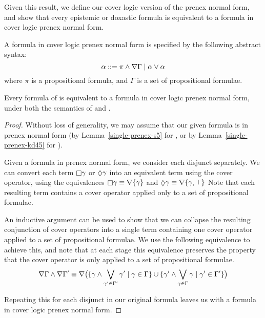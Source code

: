 Given this result, we define our cover logic version of the prenex normal form,
and show that every epistemic or doxastic formula is equivalent to a formula in
cover logic prenex normal form.

\begin{definition}
A formula in cover logic prenex normal form is specified by the following
abstract syntax: 
$$\alpha ::= \pi \land \nabla \Gamma \mid \alpha \lor \alpha$$
where $\pi$ is a propositional formula, and $\Gamma$ is a set of propositional
formulae.
\end{definition}

\begin{lemma}\label{single-cover-prenex}
Every formula of \langi{} is equivalent to a formula in cover logic prenex normal
form, under both the semantics of \logicSi{} and \logicKDi{}.
\end{lemma}

\begin{proof}
Without loss of generality, we may assume that our given formula is in prenex
normal form (by Lemma~\ref{single-prenex-s5} for \logicSi{}, or by
Lemma~\ref{single-prenex-kd45} for \logicKDi{}).

Given a formula in prenex normal form, we consider each disjunct separately. We
can convert each term $\knows \gamma$ or $\suspects \gamma$ into an equivalent
term using the cover operator, using the equivalences $\knows \gamma \equiv
\covers \{ \gamma \}$ and $\suspects \gamma \equiv \covers \{ \gamma, \top \}$ 
Note that each resulting term contains a cover operator applied only to
a set of propositional formulae.

An inductive argument can be used to show that we can collapse the resulting
conjunction of cover operators into a single term containing one cover
operator applied to a set of propositional formulae. We use the following
equivalence to achieve this, and note that at each stage this equivalence
preserves the property that the cover operator is only applied to a set of
propositional formulae.
$$
\nabla \Gamma \land \nabla \Gamma' \equiv 
\nabla \big( 
\{ \gamma \land \bigvee_{\gamma' \in \Gamma'} \gamma' \mid \gamma \in \Gamma \}
\cup
\{ \gamma' \land \bigvee_{\gamma \in \Gamma} \gamma \mid \gamma' \in \Gamma' \}
\big)
$$

Repeating this for each disjunct in our original formula leaves us with a
formula in cover logic prenex normal form.
\end{proof}

